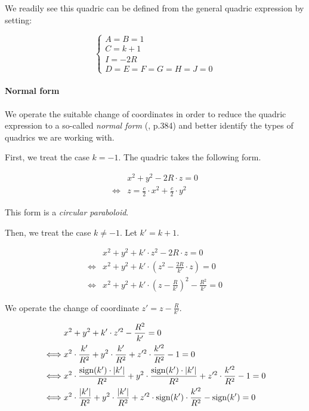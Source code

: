 We readily see this quadric can be defined from the general quadric expression
by setting:

\begin{equation} \begin{cases}
A = B = 1 \\
C = k + 1 \\
I = -2 R \\
D = E = F = G = H = J = 0
\end{cases} \end{equation}

\paragraph{Normal form}
We operate the suitable change of coordinates in order to reduce the quadric
expression to a so-called \emph{normal form} (\cite{wiki:quadric},
\cite{Venit:2008} p.384) and better identify the types of quadrics we are
working with.

First, we treat the case $k=-1$.
The quadric takes the following form.

\begin{equation} \begin{split}
&x^2 + y^2 - 2 R \cdot z = 0 \\
\iff &z = \frac{c}{2} \cdot x^2 + \frac{c}{2} \cdot y^2
\end{split} \end{equation}

This form is a \emph{circular paraboloid}.

Then, we treat the case $k \neq -1$. Let $k' = k + 1$.

\begin{equation} \begin{split}
& x^2 + y^2 + k' \cdot z^2 - 2 R \cdot z = 0 \\
\iff & x^2 + y^2 + k' \cdot \left( z^2 - \frac{2R}{k'} \cdot z\right) = 0 \\
\iff & x^2 + y^2 + k' \cdot \left( z - \frac{R}{k'} \right)^2 - \frac{R^2}{k'}
       = 0
\end{split} \end{equation}

We operate the change of coordinate $z' = z - \frac{R}{k'}$.

\begin{equation} \begin{split}
& x^2 + y^2 + k' \cdot z'^2 - \frac{R^2}{k'} = 0 \\
\iff & x^2 \cdot \frac{k'}{R^2} + y^2 \cdot \frac{k'}{R^2} +
       z'^2 \cdot \frac{k'^2}{R^2} - 1 = 0 \\
\iff & x^2 \cdot \frac{\textrm{sign}(k') \cdot \abs{k'}}{R^2} +
       y^2 \cdot \frac{\textrm{sign}(k') \cdot \abs{k'}}{R^2} +
       z'^2 \cdot \frac{k'^2}{R^2} - 1 = 0 \\
\iff & x^2 \cdot \frac{\abs{k'}}{R^2} + y^2 \cdot \frac{\abs{k'}}{R^2} +
       z'^2 \cdot \textrm{sign}(k') \cdot \frac{k'^2}{R^2} - \textrm{sign}(k')
       = 0
\end{split} \end{equation}

